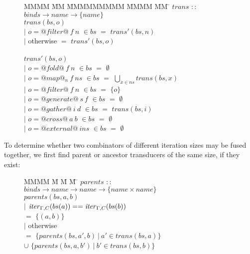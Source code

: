 \begin{figure}[H]
\begin{tabbing}
MMMM \= MM \= MMMMMMMMM \= MMMM \= MM \= \kill
$trans$  \>$::$\> $binds \rightarrow name \rightarrow \{name\}$ \\
$trans(bs,o)$    \\
            \> $|$ \> $o = @filter@~f~n$    \> $\in bs$ \> $=$ \> $trans'(bs,n)$ \\
            \> $|$ \> otherwise             \>          \> $=$ \> $trans'(bs,o)$ \\
\\
$trans'(bs,o)$    \\
            \> $|$ \> $o = @fold@~f~n$      \> $\in bs$ \> $=$ \> $\emptyset$ \\
            \> $|$ \> $o = @map@_n~f~ns$    \> $\in bs$ \> $=$ \> $\bigcup_{x \in ns} trans(bs, x)$ \\
            \> $|$ \> $o = @filter@~f~n$    \> $\in bs$ \> $=$ \> $\{o\}$       \\
            \> $|$ \> $o = @generate@~s~f$  \> $\in bs$ \> $=$ \> $\emptyset$ \\
            \> $|$ \> $o = @gather@~i~d$    \> $\in bs$ \> $=$ \> $trans(bs,i)$ \\
            \> $|$ \> $o = @cross@~a~b$     \> $\in bs$ \> $=$ \> $\emptyset$ \\
            \> $|$ \> $o = @external@~ins$  \> $\in bs$ \> $=$ \> $\emptyset$ \\
\end{tabbing}
\end{figure}

To determine whether two combinators of different iteration sizes may be fused together, we first find parent or ancestor transducers of the same size, if they exist:
\begin{figure}[H]
\begin{tabbing}
MMMM \= M \= M \= M \= \kill
$parents$ \> $::$ \> $binds \to name \to name \to \{name \times name\}$ \\
$parents(bs, a, b)$ \\
        \> $|$ \> $\mathit{iter}_{\Gamma,C}(bs(a)) == \mathit{iter}_{\Gamma,C}(bs(b))$ \\
        \>     \>                      \> $=$ \> $\{(a, b)\}$ \\
        \> $|$ \> otherwise            \\
        \>     \>                      \> $=$    \> $\{ parents(bs, a', b) ~|~ a' \in trans(bs, a) \} $      \\
        \>     \>                      \> $\cup$ \> $\{ parents(bs, a, b') ~|~ b' \in trans(bs, b) \} $  \\
\end{tabbing}
\end{figure}

